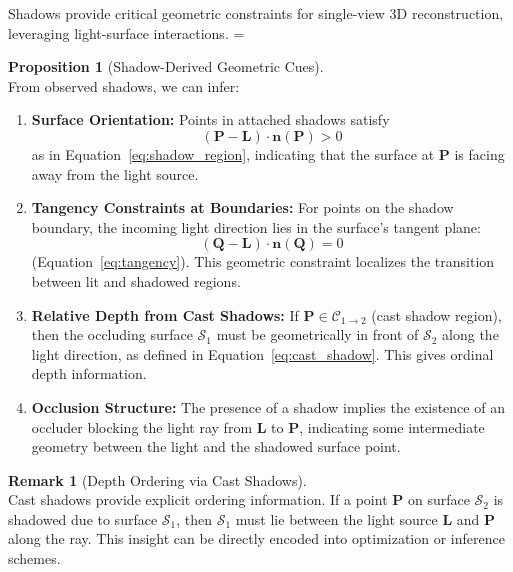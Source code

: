 \documentclass[12pt]{article}
\newcommand{\vect}[1]{\bm{#1}}
\theoremstyle{definition}
\newtheorem{proposition}{Proposition}[subsection]
\newtheorem{remark}{Remark}[subsection]
\begin{document}
Shadows provide critical geometric constraints for single-view 3D reconstruction, leveraging light-surface interactions.
= 
\begin{proposition}[Shadow-Derived Geometric Cues] \label{prop:shadow_cues} ~\\
From observed shadows, we can infer:
\begin{enumerate}[label=(\roman*)]
    \item \textbf{Surface Orientation:} Points in attached shadows satisfy
    \[
    (\vect{P} - \vect{L}) \cdot \vect{n}(\vect{P}) > 0
    \]
    as in Equation~\eqref{eq:shadow_region}, indicating that the surface at $\vect{P}$ is facing away from the light source.

    \item \textbf{Tangency Constraints at Boundaries:} For points on the shadow boundary, the incoming light direction lies in the surface's tangent plane:
    \[
    (\vect{Q} - \vect{L}) \cdot \vect{n}(\vect{Q}) = 0
    \]
    (Equation~\eqref{eq:tangency}). This geometric constraint localizes the transition between lit and shadowed regions.

    \item \textbf{Relative Depth from Cast Shadows:} If $\vect{P} \in \mathcal{C}_{1 \to 2}$ (cast shadow region), then the occluding surface $\mathcal{S}_1$ must be geometrically in front of $\mathcal{S}_2$ along the light direction, as defined in Equation~\eqref{eq:cast_shadow}. This gives ordinal depth information.

    \item \textbf{Occlusion Structure:} The presence of a shadow implies the existence of an occluder blocking the light ray from $\vect{L}$ to $\vect{P}$, indicating some intermediate geometry between the light and the shadowed surface point.
\end{enumerate}
\end{proposition}

\begin{remark}[Depth Ordering via Cast Shadows] \label{rmk:depth_order} ~\\
Cast shadows provide explicit ordering information. If a point $\vect{P}$ on surface $\mathcal{S}_2$ is shadowed due to surface $\mathcal{S}_1$, then $\mathcal{S}_1$ must lie between the light source $\vect{L}$ and $\vect{P}$ along the ray. This insight can be directly encoded into optimization or inference schemes.
\end{remark}

\newpage
\end{document}
